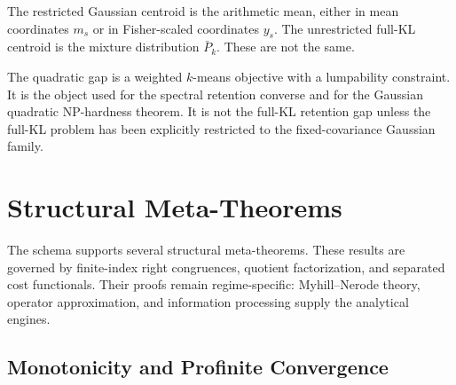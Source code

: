 \documentclass[12pt]{article}
\theoremstyle{definition}
\begin{document}
The restricted Gaussian centroid is the arithmetic mean, either in mean
coordinates $m_s$ or in Fisher-scaled coordinates $y_s$.  The unrestricted
full-KL centroid is the mixture distribution $\bar P_k$.  These are not the
same.

The quadratic gap is a weighted $k$-means objective with a lumpability
constraint.  It is the object used for the spectral retention converse and for
the Gaussian quadratic NP-hardness theorem.  It is not the full-KL retention
gap unless the full-KL problem has been explicitly restricted to the
fixed-covariance Gaussian family.

\section{Structural Meta-Theorems}
\label{sec:meta}

The schema supports several structural meta-theorems.  These results are
governed by finite-index right congruences, quotient factorization, and
separated cost functionals.  Their proofs remain regime-specific:
Myhill--Nerode theory, operator approximation, and information processing
supply the analytical engines.

\subsection{Monotonicity and Profinite Convergence}
\label{subsec:meta-monotone}
\end{document}

